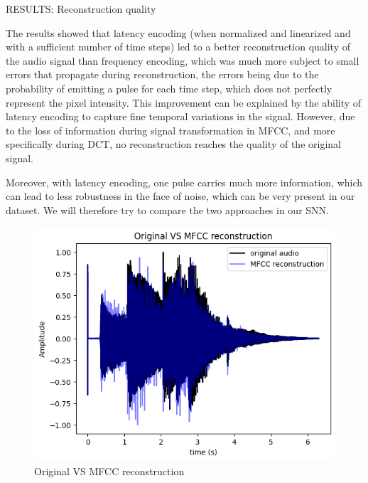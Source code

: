 \documentclass[11pt]{article}
\begin{document}
RESULTS: Reconstruction quality

The results showed that latency encoding (when normalized and linearized and with a sufficient number of time steps) led to a better reconstruction quality of the audio signal than frequency encoding, which was much more subject to small errors that propagate during reconstruction, the errors being due to the probability of emitting a pulse for each time step, which does not perfectly represent the pixel intensity. This improvement can be explained by the ability of latency encoding to capture fine temporal variations in the signal. However, due to the loss of information during signal transformation in MFCC, and more specifically during DCT, no reconstruction reaches the quality of the original signal.

Moreover, with latency encoding, one pulse carries much more information, which can lead to less robustness in the face of noise, which can be very present in our dataset. We will therefore try to compare the two approaches in our SNN.

\begin{figure}[h]
  \centering
  \begin{minipage}{0.45\textwidth}
    \centering
    \includegraphics[width=1\textwidth]{"image/Original VS MFCC reconstruction.png"}
    \caption{Original VS MFCC reconstruction}
    \label{fig:OVSM}
  \end{minipage}\hfill
\end{figure}
\end{document}
